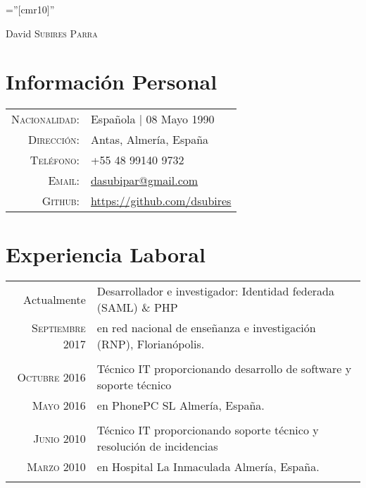 \documentclass[a4paper,10pt]{article}
\begin{document}
\pagestyle{empty} %

\font\fb=''[cmr10]'' %

\par{\centering
		{\Huge David \textsc{Subires Parra}
	}\bigskip\par}

\section*{Información Personal}

\begin{tabular}{rp{12cm}}
    \textsc{Nacionalidad:} & Española | 08 Mayo 1990 \\
    \textsc{Dirección:}     & Antas, Almería, España \\
    \textsc{Teléfono:}       & +55 48 99140 9732 \\
    \textsc{Email:}       & \href {mailto:dasubipar@gmail.com}{dasubipar@gmail.com} \\
    \textsc{Github:}      & \url{https://github.com/dsubires}
\end{tabular}

\section*{Experiencia Laboral}
\begin{tabular}{r|p{11cm}}

\textsc Actualmente & Desarrollador e investigador: Identidad federada (SAML) \& PHP
\\\textsc{Septiembre 2017} & en red nacional de enseñanza e investigación (RNP), Florianópolis.  \normalsize \\\multicolumn{2}{c}{} \\



\textsc{Octubre} 2016 & Técnico IT proporcionando desarrollo de software y soporte técnico\\\textsc{Mayo 2016} & en PhonePC SL Almería, España. \normalsize \\\multicolumn{2}{c}{} \\


\textsc{Junio} 2010 & Técnico IT proporcionando soporte técnico y resolución de incidencias\\\textsc{Marzo 2010} & en Hospital La Inmaculada Almería, España. \normalsize \\\multicolumn{2}{c}{} \\


\end{tabular}
\end{document}
